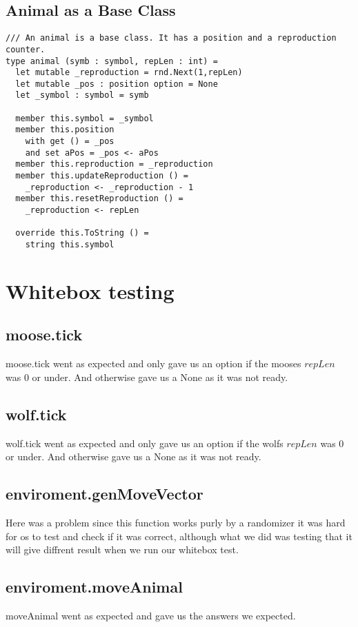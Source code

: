 \documentclass{article}
\begin{document}
    \subsection{Animal as a Base Class}
		\lstset{language=FSharp}

		\begin{lstlisting}
/// An animal is a base class. It has a position and a reproduction counter.
type animal (symb : symbol, repLen : int) =
  let mutable _reproduction = rnd.Next(1,repLen)
  let mutable _pos : position option = None
  let _symbol : symbol = symb

  member this.symbol = _symbol
  member this.position
    with get () = _pos
    and set aPos = _pos <- aPos
  member this.reproduction = _reproduction
  member this.updateReproduction () =
    _reproduction <- _reproduction - 1
  member this.resetReproduction () =
    _reproduction <- repLen

  override this.ToString () =
    string this.symbol
		\end{lstlisting}
		
         
\section{Whitebox testing}
    \subsection{moose.tick}
    moose.tick went as expected and only gave us an option if the mooses $repLen$ was 0 or under. And otherwise gave us a None as it was not ready.
    
    \subsection{wolf.tick}
    wolf.tick went as expected and only gave us an option if the wolfs $repLen$ was 0 or under. And otherwise gave us a None as it was not ready.
    
    \subsection{enviroment.genMoveVector}
    Here was a problem since this function works purly by a randomizer it was hard for os to test and check if it was correct, although what we did was testing that it will give diffrent result when we run our whitebox test.
    
    \subsection{enviroment.moveAnimal}
    moveAnimal went as expected and gave us the answers we expected.
    
\end{document}
